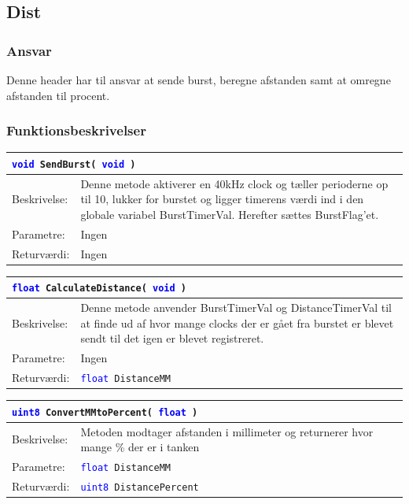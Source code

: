 \subsection{Dist}
\subsubsection{Ansvar}
Denne header har til ansvar at sende burst, beregne afstanden samt at omregne afstanden til procent.
\subsubsection{Funktionsbeskrivelser}
\begin{table}[H]
\begin{tabular}{l p{12.5cm}}
\multicolumn{2}{l}{\texttt{\textcolor{blue}{void} SendBurst( \textcolor{blue}{void} )}} \\
\hline
Beskrivelse:&Denne metode aktiverer en 40kHz clock og tæller perioderne op til 10, lukker for burstet og ligger timerens værdi ind i den globale variabel BurstTimerVal. Herefter sættes BurstFlag'et.\\
Parametre:&Ingen\\
Returværdi:&Ingen\\
\end{tabular}
\end{table}

\begin{table}[H]
\begin{tabular}{l p{12.5cm}}
\multicolumn{2}{l}{\texttt{\textcolor{blue}{float} CalculateDistance( \textcolor{blue}{void} )}} \\
\hline
Beskrivelse:&Denne metode anvender BurstTimerVal og DistanceTimerVal til at finde ud af hvor mange clocks der er gået fra burstet er blevet sendt til det igen er blevet registreret.\\
Parametre:&Ingen\\
Returværdi:&\texttt{\textcolor{blue}{float} DistanceMM}\\
\end{tabular}
\end{table}

\begin{table}[H]
\begin{tabular}{l p{12.5cm}}
\multicolumn{2}{l}{\texttt{\textcolor{blue}{uint8} ConvertMMtoPercent( \textcolor{blue}{float} )}} \\
\hline
Beskrivelse:&Metoden modtager afstanden i millimeter og returnerer hvor mange \% der er i tanken\\
Parametre:&\texttt{\textcolor{blue}{float} DistanceMM}\\
Returværdi:&\texttt{\textcolor{blue}{uint8} DistancePercent}\\
\end{tabular}
\end{table}

